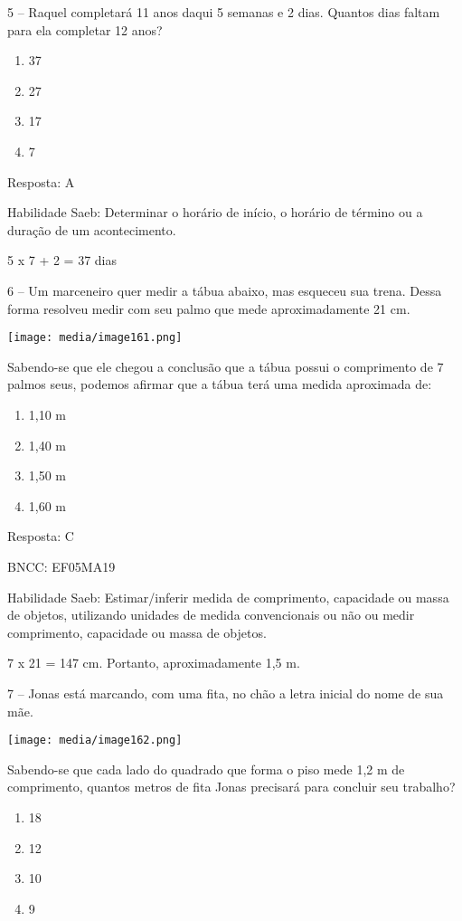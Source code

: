 5 -- Raquel completará 11 anos daqui 5 semanas e 2 dias. Quantos dias
faltam para ela completar 12 anos?

\begin{enumerate}
\def\labelenumi{\alph{enumi})}
\item
  37
\item
  27
\item
  17
\item
  7
\end{enumerate}

Resposta: A

Habilidade Saeb: Determinar o horário de início, o horário de término ou
a duração de um acontecimento.

5 x 7 + 2 = 37 dias

6 -- Um marceneiro quer medir a tábua abaixo, mas esqueceu sua trena.
Dessa forma resolveu medir com seu palmo que mede aproximadamente 21 cm.

\texttt{[image: media/image161.png]}

Sabendo-se que ele chegou a conclusão que a tábua possui o comprimento
de 7 palmos seus, podemos afirmar que a tábua terá uma medida aproximada
de:

\begin{enumerate}
\def\labelenumi{\alph{enumi})}
\item
  1,10 m
\item
  1,40 m
\item
  1,50 m
\item
  1,60 m
\end{enumerate}

Resposta: C

BNCC: EF05MA19

Habilidade Saeb: Estimar/inferir medida de comprimento, capacidade ou
massa de objetos, utilizando unidades de medida convencionais ou não ou
medir comprimento, capacidade ou massa de objetos.

7 x 21 = 147 cm. Portanto, aproximadamente 1,5 m.

7 -- Jonas está marcando, com uma fita, no chão a letra inicial do nome
de sua mãe.

\texttt{[image: media/image162.png]}

Sabendo-se que cada lado do quadrado que forma o piso mede 1,2 m de
comprimento, quantos metros de fita Jonas precisará para concluir seu
trabalho?

\begin{enumerate}
\def\labelenumi{\alph{enumi})}
\item
  18
\item
  12
\item
  10
\item
  9
\end{enumerate}

